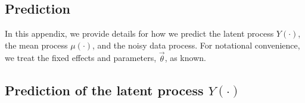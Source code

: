 \documentclass[12pt,a4paper]{article}
\begin{document}
\begin{appendices}




\section{Prediction}\label{app:prediction}



In this appendix, we provide details for how we predict the latent process $Y(\cdot)$, the mean process $\mu(\cdot)$, and the noisy data process. 
For notational convenience, we treat the fixed effects and parameters, $\vec{\theta}$, as known.



\subsection{Prediction of the latent process $Y(\cdot)$}\label{sec:04-03-01:YProcessPrediction}



\end{appendices}
\end{document}
